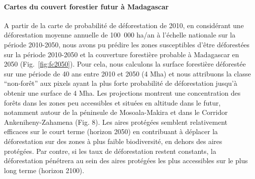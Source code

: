\documentclass[12pt,]{article}
\let\oldparagraph\paragraph
\renewcommand{\paragraph}[1]{\oldparagraph{#1}\mbox{}}
\begin{document}
\hypertarget{cartes-du-couvert-forestier-futur-a-madagascar-1}{%
\paragraph{Cartes du couvert forestier futur à
Madagascar}\label{cartes-du-couvert-forestier-futur-a-madagascar-1}}

A partir de la carte de probabilité de déforestation de 2010, en
considérant une déforestation moyenne annuelle de 100~000 ha/an à
l'échelle nationale sur la période 2010-2050, nous avons pu prédire les
zones susceptibles d'être déforestées sur la période 2010-2050 et la
couverture forestière probable à Madagascar en 2050
(Fig.~\ref{fig:fc2050}). Pour cela, nous calculons la surface forestière
déforestée sur une période de 40 ans entre 2010 et 2050 (4 Mha) et nous
attribuons la classe ``non-forêt'' aux pixels ayant la plus forte
probabilité de déforestation jusqu'à obtenir une surface de 4 Mha. Les
projections montrent une concentration des forêts dans les zones peu
accessibles et situées en altitude dans le futur, notamment autour de la
péninsule de Mosoala-Makira et dans le Corridor Ankeniheny-Zahamena
(Fig. 8). Les aires protégées semblent relativement efficaces sur le
court terme (horizon 2050) en contribuant à déplacer la déforestation
sur des zones à plus faible biodiversité, en dehors des aires protégées.
Par contre, si les taux de déforestation restent constants, la
déforestation pénétrera au sein des aires protégées les plus accessibles
sur le plus long terme (horizon 2100).
\end{document}
